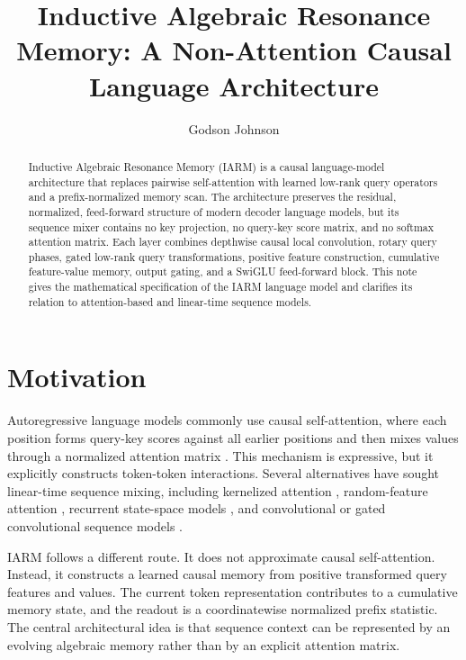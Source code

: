 \documentclass[10pt]{article}
\title{Inductive Algebraic Resonance Memory: A Non-Attention Causal Language Architecture}
\author{Godson Johnson}
\date{}
\begin{document}
\maketitle

\begin{abstract}
Inductive Algebraic Resonance Memory (IARM) is a causal language-model architecture that replaces pairwise self-attention with learned low-rank query operators and a prefix-normalized memory scan. The architecture preserves the residual, normalized, feed-forward structure of modern decoder language models, but its sequence mixer contains no key projection, no query-key score matrix, and no softmax attention matrix. Each layer combines depthwise causal local convolution, rotary query phases, gated low-rank query transformations, positive feature construction, cumulative feature-value memory, output gating, and a SwiGLU feed-forward block. This note gives the mathematical specification of the IARM language model and clarifies its relation to attention-based and linear-time sequence models.
\end{abstract}

\section{Motivation}
Autoregressive language models commonly use causal self-attention, where each position forms query-key scores against all earlier positions and then mixes values through a normalized attention matrix \cite{vaswani2017attention}. This mechanism is expressive, but it explicitly constructs token-token interactions. Several alternatives have sought linear-time sequence mixing, including kernelized attention \cite{katharopoulos2020transformers}, random-feature attention \cite{choromanski2021rethinking}, recurrent state-space models \cite{gu2023mamba}, and convolutional or gated convolutional sequence models \cite{chollet2017xception,dauphin2017language}.

IARM follows a different route. It does not approximate causal self-attention. Instead, it constructs a learned causal memory from positive transformed query features and values. The current token representation contributes to a cumulative memory state, and the readout is a coordinatewise normalized prefix statistic. The central architectural idea is that sequence context can be represented by an evolving algebraic memory rather than by an explicit attention matrix.
\end{document}

